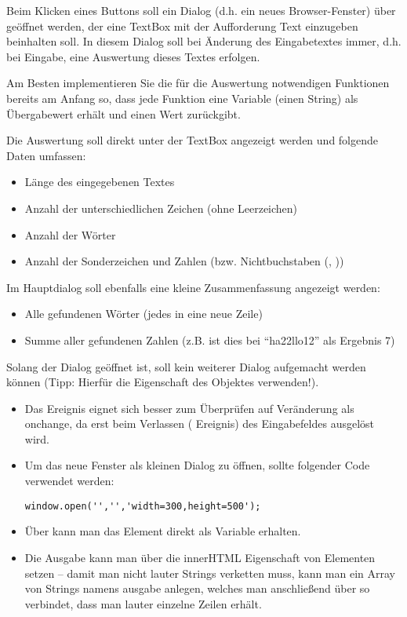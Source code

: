 %
\par Beim Klicken eines Buttons soll ein Dialog (d.h. ein neues
Browser-Fenster) über  geöffnet werden, der eine TextBox mit
der Aufforderung Text einzugeben beinhalten soll. In diesem Dialog soll bei
Änderung des Eingabetextes immer, d.h. bei Eingabe, eine Auswertung dieses
Textes erfolgen.
%
\par Am Besten implementieren Sie die für die Auswertung notwendigen Funktionen
bereits am Anfang so, dass jede Funktion eine Variable (einen String) als
Übergabewert erhält und einen Wert zurückgibt.
%
\par Die Auswertung soll direkt unter der TextBox angezeigt werden und folgende
Daten umfassen:
%
\begin{itemize}
\item
Länge des eingegebenen Textes
\item
Anzahl der unterschiedlichen Zeichen (ohne Leerzeichen)
\item
Anzahl der Wörter
\item
Anzahl der Sonderzeichen und Zahlen (bzw. Nichtbuchstaben (,
))
\end{itemize}
%
\par Im Hauptdialog soll ebenfalls eine kleine Zusammenfassung angezeigt
werden:
%
\begin{itemize}
\item Alle gefundenen Wörter (jedes in eine neue Zeile)
\item Summe aller gefundenen Zahlen (z.B. ist dies bei ``ha22llo12'' als
Ergebnis 7)
\end{itemize}
%
\par Solang der Dialog geöffnet ist, soll kein weiterer Dialog aufgemacht werden
können (Tipp: Hierfür die Eigenschaft  des  Objektes
verwenden!).
%
%
\begin{itemize}
\item
Das Ereignis  eignet sich besser zum Überprüfen auf Veränderung
als onchange, da  erst beim Verlassen ( Ereignis)
des Eingabefeldes ausgelöst wird.
\item
Um das neue Fenster als kleinen Dialog zu öffnen, sollte folgender Code
verwendet werden:
%
\begin{lstlisting}
window.open('','','width=300,height=500');
\end{lstlisting}
%
\item
Über  kann man das Element direkt als Variable erhalten.
\item
Die Ausgabe kann man über die innerHTML Eigenschaft von Elementen setzen –
damit man nicht lauter Strings verketten muss, kann man ein Array von Strings
namens ausgabe anlegen, welches man anschließend über
 so verbindet, dass man lauter einzelne Zeilen
erhält.
\end{itemize}
%